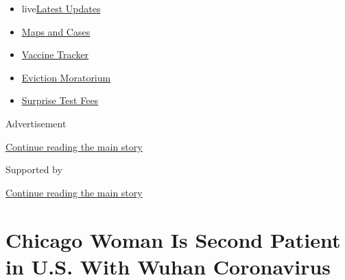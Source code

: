 \begin{itemize}
\tightlist
\item
  live\href{https://www.nytimes3xbfgragh.onion/2020/09/09/world/covid-19-coronavirus.html?name=styln-coronavirus-national\&region=TOP_BANNER\&block=storyline_menu_recirc\&action=click\&pgtype=Article\&impression_id=be1d43a0-f2b6-11ea-906f-138457fe2f11\&variant=undefined}{Latest
  Updates}
\item
  \href{https://www.nytimes3xbfgragh.onion/interactive/2020/us/coronavirus-us-cases.html?name=styln-coronavirus-national\&region=TOP_BANNER\&block=storyline_menu_recirc\&action=click\&pgtype=Article\&impression_id=be1d43a1-f2b6-11ea-906f-138457fe2f11\&variant=undefined}{Maps
  and Cases}
\item
  \href{https://www.nytimes3xbfgragh.onion/interactive/2020/science/coronavirus-vaccine-tracker.html?name=styln-coronavirus-national\&region=TOP_BANNER\&block=storyline_menu_recirc\&action=click\&pgtype=Article\&impression_id=be1d43a2-f2b6-11ea-906f-138457fe2f11\&variant=undefined}{Vaccine
  Tracker}
\item
  \href{https://www.nytimes3xbfgragh.onion/2020/09/02/your-money/eviction-moratorium-covid.html?name=styln-coronavirus-national\&region=TOP_BANNER\&block=storyline_menu_recirc\&action=click\&pgtype=Article\&impression_id=be1d6ab0-f2b6-11ea-906f-138457fe2f11\&variant=undefined}{Eviction
  Moratorium}
\item
  \href{https://www.nytimes3xbfgragh.onion/2020/09/09/upshot/coronavirus-surprise-test-fees.html?name=styln-coronavirus-national\&region=TOP_BANNER\&block=storyline_menu_recirc\&action=click\&pgtype=Article\&impression_id=be1d6ab1-f2b6-11ea-906f-138457fe2f11\&variant=undefined}{Surprise
  Test Fees}
\end{itemize}

Advertisement

\protect\hyperlink{after-top}{Continue reading the main story}

Supported by

\protect\hyperlink{after-sponsor}{Continue reading the main story}

\hypertarget{chicago-woman-is-second-patient-in-us-with-wuhan-coronavirus}{%
\section{Chicago Woman Is Second Patient in U.S. With Wuhan
Coronavirus}\label{chicago-woman-is-second-patient-in-us-with-wuhan-coronavirus}}

